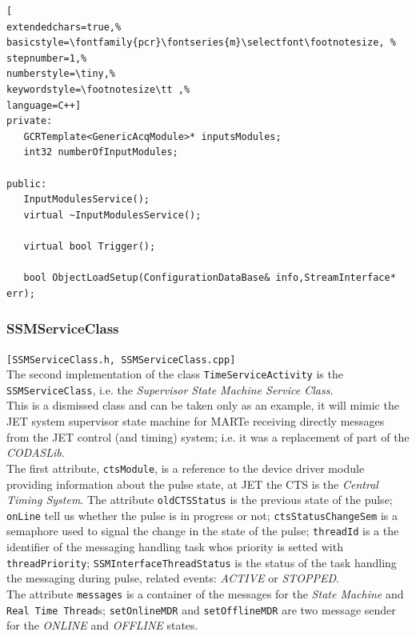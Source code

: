 \begin{lstlisting}[
extendedchars=true,%
basicstyle=\fontfamily{pcr}\fontseries{m}\selectfont\footnotesize, %
stepnumber=1,%
numberstyle=\tiny,%
keywordstyle=\footnotesize\tt ,%
language=C++]
private:
   GCRTemplate<GenericAcqModule>* inputsModules;
   int32 numberOfInputModules;

public:
   InputModulesService();
   virtual ~InputModulesService();

   virtual bool Trigger();

   bool ObjectLoadSetup(ConfigurationDataBase& info,StreamInterface* err);
\end{lstlisting}



\subsubsection{SSMServiceClass}
\texttt{[SSMServiceClass.h, SSMServiceClass.cpp]} \\
The second implementation of the class \texttt{TimeServiceActivity} is the \texttt{SSMServiceClass}, i.e. the \textit{Supervisor State Machine Service Class}. \\


This is a dismissed class and can be taken only as an example, it will mimic the JET system supervisor state machine for MARTe receiving directly messages from the JET control (and timing) system; i.e. it was a replacement of part of the \textit{CODASLib}.\\


The first attribute, \texttt{ctsModule}, is a reference to the device driver module providing information about the pulse state, at JET the CTS is the \textit{Central Timing System}. The attribute \texttt{oldCTSStatus} is the previous state of the pulse; \texttt{onLine} tell us whether the pulse is in progress or not; \texttt{ctsStatusChangeSem} is a semaphore used to signal the change in the state of the pulse; \texttt{threadId} is a the identifier of the messaging handling task whos priority is setted with \texttt{threadPriority}; \texttt{SSMInterfaceThreadStatus} is the status of the task handling the messaging during pulse, related events: \textit{ACTIVE} or \textit{STOPPED}. \\


The attribute \texttt{messages} is a container of the messages for the \textit{State Machine} and \texttt{Real Time Thread}s; \texttt{setOnlineMDR} and \texttt{setOfflineMDR} are two message sender for the \textit{ONLINE} and \textit{OFFLINE} states.

